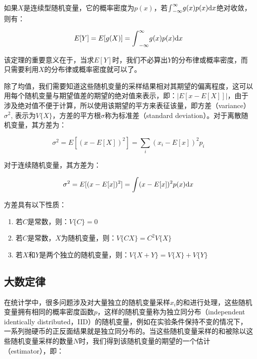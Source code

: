如果$X$是连续型随机变量，它的概率密度为$p(x)$，若${\rm \int}^{\infty}_{-\infty}g(x)p(x){\rm d}x$绝对收敛，则有：

\begin{equation}
	E[Y]=E[g(X)]={\rm \int}^{\infty}_{-\infty}g(x)p(x){\rm d}x
\end{equation}

该定理的重要意义在于，当求$E[Y]$时，我们不必算出$Y$的分布律或概率密度，而只需要利用$X$的分布律或概率密度就可以了。

除了均值，我们需要知道这些随机变量的采样结果相对其期望的偏离程度，这可以用每个随机变量与期望值差的期望的绝对值来表示，即：$|E[x-E[X]]|$，由于涉及绝对值不便于计算，所以使用该期望的平方来表征该量，即方差（variance）$\sigma^2$, 表示为$V\{X\}$，方差的平方根$\sigma$称为标准差（standard deviation）。对于离散随机变量，其方差为：

\begin{equation}
	\sigma^2=E[(x-E[X])^2]=\sum_i (x_i-E[x])^2p_i
\end{equation}

\noindent 对于连续随机变量，其方差为：

\begin{equation}\label{e:discrete-variance}
	\sigma^2=E[(x-E[x])^2]={\rm \int} (x-E[x])^2 p(x){\rm d}x
\end{equation}

方差具有以下性质：
\begin{enumerate}
	\item 若$C$是常数，则：$V\{C\}=0$
	\item 若$C$是常数，$X$为随机变量，则：$V\{CX\}=C^2V\{X\}$
	\item 若$X$和$Y$是两个独立的随机变量，则：$V\{X+Y\}=V\{X\}+V\{Y\}$
\end{enumerate}



\subsection{大数定律}
在统计学中，很多问题涉及对大量独立的随机变量采样$x_i$的和进行处理，这些随机变量拥有相同的概率密度函数$p$，这样的随机变量称为独立同分布（independent identically distributed，IID）的随机变量，例如在实验条件保持不变的情况下，一系列抛硬币的正反面结果就是独立同分布的。当这些随机变量采样的和被除以这些随机变量采样的数量$N$时，我们得到该随机变量的期望的一个估计（estimator），即：

